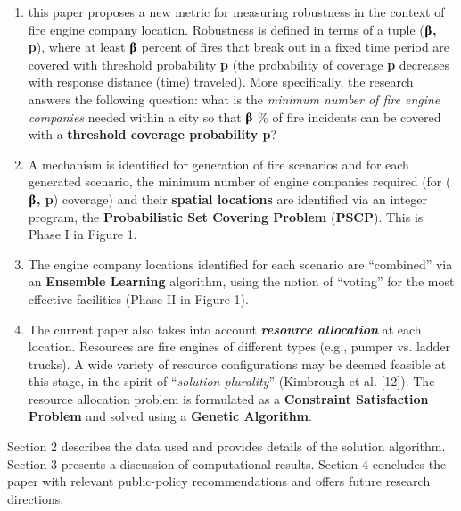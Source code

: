 \documentclass{article} %
\begin{document}
\begin{enumerate}
\item  this paper proposes a new metric for measuring robustness in the context of fire engine company location.  Robustness is defined in terms of a tuple (\textbf{$\boldsymbol{\betaup}$, p}), where at least \textbf{$\boldsymbol{\betaup}$} percent of fires that break out in a fixed time period are covered with threshold probability \textbf{p} (the probability of coverage \textbf{p} decreases with response distance (time) traveled).  More specifically, the research answers the following question:  what is the \textit{minimum number of fire engine companies} needed within a city so that \textbf{$\boldsymbol{\betaup}$} \% of fire incidents can be covered with a \textbf{threshold coverage probability p}? 

\item  A mechanism is identified for generation of fire scenarios and for each generated scenario, the minimum number of engine companies required (for (\textbf{$\boldsymbol{\betaup}$, p}) coverage) and their \textbf{spatial locations} are identified via an integer program, the \textbf{Probabilistic Set Covering Problem} (\textbf{PSCP}).  This is Phase I in Figure 1.

\item  The engine company locations identified for each scenario are ``combined'' via an \textbf{Ensemble Learning} algorithm, using the notion of ``voting'' for the most effective facilities (Phase II in Figure 1).

\item  The current paper also takes into account \textbf{\textit{resource allocation}} at each location.  Resources are fire engines of different types (e.g., pumper vs. ladder trucks).  A wide variety of resource configurations may be deemed feasible at this stage, in the spirit of ``\textit{solution plurality}'' (Kimbrough et al. [12]).  The resource allocation problem is formulated as a \textbf{Constraint Satisfaction Problem} and solved using a \textbf{Genetic Algorithm}.
\end{enumerate}

\noindent 

\noindent Section 2 describes the data used and provides details of the solution algorithm.  Section 3 presents a discussion of computational results.  Section 4 concludes the paper with relevant public-policy recommendations and offers future research directions.

\noindent \textbf{}
\end{document}
